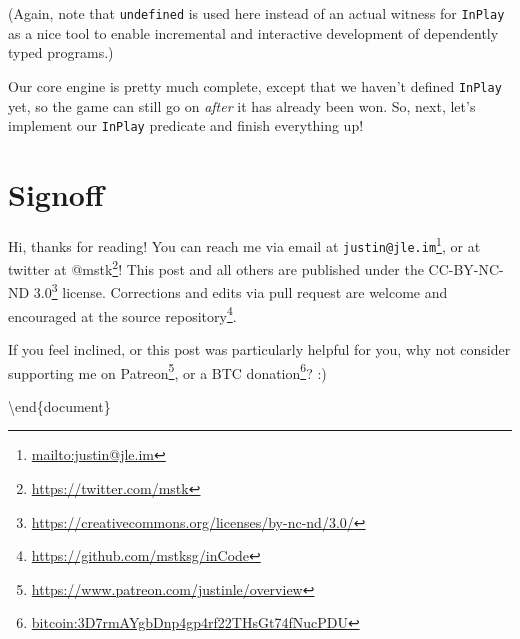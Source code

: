 \documentclass[]{article}
\renewcommand{\href}[2]{#2\footnote{\url{#1}}}
\begin{document}
(Again, note that \texttt{undefined} is used here instead of an actual witness
for \texttt{InPlay} as a nice tool to enable incremental and interactive
development of dependently typed programs.)

Our core engine is pretty much complete, except that we haven't defined
\texttt{InPlay} yet, so the game can still go on \emph{after} it has already
been won. So, next, let's implement our \texttt{InPlay} predicate and finish
everything up!

\section{Signoff}\label{signoff}

Hi, thanks for reading! You can reach me via email at
\href{mailto:justin@jle.im}{\nolinkurl{justin@jle.im}}, or at twitter at
\href{https://twitter.com/mstk}{@mstk}! This post and all others are published
under the \href{https://creativecommons.org/licenses/by-nc-nd/3.0/}{CC-BY-NC-ND
3.0} license. Corrections and edits via pull request are welcome and encouraged
at \href{https://github.com/mstksg/inCode}{the source repository}.

If you feel inclined, or this post was particularly helpful for you, why not
consider \href{https://www.patreon.com/justinle/overview}{supporting me on
Patreon}, or a \href{bitcoin:3D7rmAYgbDnp4gp4rf22THsGt74fNucPDU}{BTC donation}?
:)

\textbackslash end\{document\}
\end{document}
